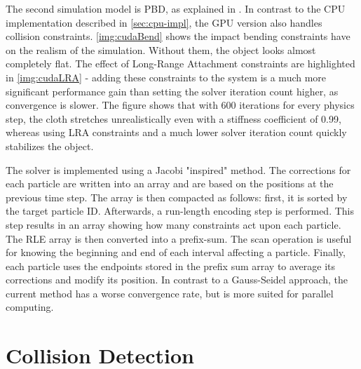 The second simulation model is PBD, as explained in \citep{mullerpbd}. In contrast to the CPU implementation described in \autoref{sec:cpu-impl}, the GPU version also handles collision constraints. \autoref{img:cudaBend} shows the impact bending constraints have on the realism of the simulation. Without them, the object looks almost completely flat. The effect of Long-Range Attachment constraints are highlighted in \autoref{img:cudaLRA} - adding these constraints to the system is a much more significant performance gain than setting the solver iteration count higher, as convergence is slower. The figure shows that with 600 iterations for every physics step, the cloth stretches unrealistically even with a stiffness coefficient of 0.99, whereas using LRA constraints and a much lower solver iteration count quickly stabilizes the object.



The solver is implemented using a Jacobi "inspired" method. The corrections for each particle are written into an array and are based on the positions at the previous time step. The array is then compacted as follows: first, it is sorted by the target particle ID. Afterwards, a run-length encoding step is performed. This step results in an array showing how many constraints act upon each particle. The RLE array is then converted into a prefix-sum. The scan operation is useful for knowing the beginning and end of each interval affecting a particle. Finally, each particle uses the endpoints stored in the prefix sum array to average its corrections and modify its position. In contrast to a Gauss-Seidel approach, the current method has a worse convergence rate, but is more suited for parallel computing.





\section{Collision Detection}
\label{sec:cd}

